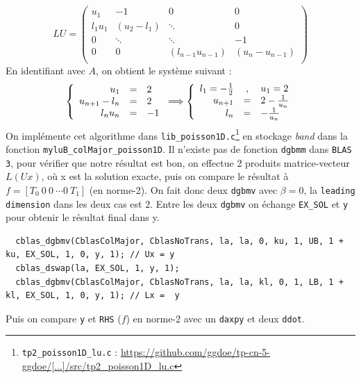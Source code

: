 \documentclass{article}
\begin{document}
\[
	LU = 
	\begin{pmatrix}
			u_1		& 	-1		&	0				& 0		\\
			l_1 u_1	&	(u_2-l_1)	&\ddots				& 0		\\
			0		& 	\ddots	&\ddots				& -1	\\
			0		& 	0		& (l_{n-1} u_{n-1}) 	& (u_n-u_{n-1})	\\
	\end{pmatrix}
\]
En identifiant avec $A$, on obtient le système suivant :
\[
	\left \{
	\begin{array}{r c l}
		u_1 & = & 2 \\
		u_{n+1} - l_n & = & 2 \\
		l_n u_n & = & -1
	\end{array}
	\right .
	\Longrightarrow
	\left \{
	\begin{array}{r c l}
		l_1 = -\frac{1}{2} & , & u_1 = 2 \\
		u_{n+1} & = & 2 - \frac{1}{u_n} \\
		l_n & = & -\frac{1}{u_n}
	\end{array}
	\right .
\]
On implémente cet algorithme dans \texttt{lib\_poisson1D.c}\footnote{\texttt{tp2\_poisson1D\_lu.c} : \href{https://github.com/ggdoe/tp-cn-5-ggdoe/blob/master/TP_Poisson_C_for_students/src/tp2_poisson1D_lu.c}{https://github.com/ggdoe/tp-cn-5-ggdoe/[...]/src/tp2\_poisson1D\_lu.c}} en stockage \textit{band} dans la fonction \texttt{myluB\_colMajor\_poisson1D}. Il n'existe pas de fonction \texttt{dgbmm} dans \texttt{BLAS 3}, pour vérifier que notre résultat est bon, on effectue 2 produits matrice-vecteur \(L(Ux)\), où x est la solution exacte, puis on compare le résultat à \(f = \left[T_0\ 0\ 0\ \cdots 0\ T_1\right]\) (en norme-2).
On fait donc deux \texttt{dgbmv} avec $\beta = 0$, la \texttt{leading dimension} dans les deux cas est $2$. Entre les deux \texttt{dgbmv} on échange \texttt{EX\_SOL} et \texttt{y} pour obtenir le résultat final dans y.
\begin{scriptsize}
\begin{verbatim}
  cblas_dgbmv(CblasColMajor, CblasNoTrans, la, la, 0, ku, 1, UB, 1 + ku, EX_SOL, 1, 0, y, 1); // Ux = y
  cblas_dswap(la, EX_SOL, 1, y, 1);
  cblas_dgbmv(CblasColMajor, CblasNoTrans, la, la, kl, 0, 1, LB, 1 + kl, EX_SOL, 1, 0, y, 1); // Lx =  y
\end{verbatim}
\end{scriptsize}
Puis on compare \texttt{y} et \texttt{RHS} ($f$) en norme-2 avec un \texttt{daxpy} et deux \texttt{ddot}.
\end{document}
